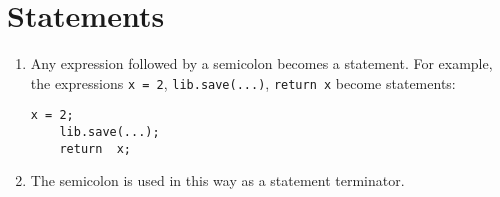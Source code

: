 \section{Statements}

\begin{enumerate}
	\item Any expression followed by a semicolon becomes a statement. For example, the expressions \lstinline|x = 2|, \lstinline|lib.save(...)|, \lstinline|return x| become statements:
\begin{lstlisting}[numbers=none]
	x = 2;
	lib.save(...);
	return  x;
\end{lstlisting}
	\item The semicolon is used in this way as a statement terminator.
\end{enumerate} 
